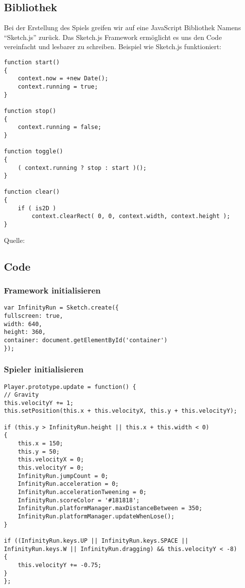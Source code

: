\subsection{Bibliothek}
Bei der Erstellung des Spiels greifen wir auf eine JavaScript Bibliothek Namens ``Sketch.js'' zurück.
Das Sketch.js Framework ermöglicht es uns den Code vereinfacht und lesbarer zu schreiben. 
Beispiel wie Sketch.js funktioniert:

\lstset{language=java}
\begin{lstlisting}[frame=single]
function start() 
{
	context.now = +new Date();
    context.running = true;
}
        
function stop() 
{
	context.running = false;
}
        
function toggle() 
{       
	( context.running ? stop : start )();
}
        
function clear() 
{        
	if ( is2D )
        context.clearRect( 0, 0, context.width, context.height );
}
\end{lstlisting}
Quelle: \cite{sketch}
\subsection{Code}
\subsubsection{Framework initialisieren}
\lstset{language=java}
\begin{lstlisting}[frame=single]
var InfinityRun = Sketch.create({
fullscreen: true,
width: 640,
height: 360,
container: document.getElementById('container')
});
\end{lstlisting}
\subsubsection{Spieler initialisieren}
\lstset{language=java}
\begin{lstlisting}[frame=single]
Player.prototype.update = function() {
// Gravity 
this.velocityY += 1;
this.setPosition(this.x + this.velocityX, this.y + this.velocityY);

if (this.y > InfinityRun.height || this.x + this.width < 0) 
{
	this.x = 150;
	this.y = 50;
	this.velocityX = 0;
	this.velocityY = 0;
	InfinityRun.jumpCount = 0;
	InfinityRun.acceleration = 0;
	InfinityRun.accelerationTweening = 0;
	InfinityRun.scoreColor = '#181818';
	InfinityRun.platformManager.maxDistanceBetween = 350;
	InfinityRun.platformManager.updateWhenLose();
}

if ((InfinityRun.keys.UP || InfinityRun.keys.SPACE || InfinityRun.keys.W || InfinityRun.dragging) && this.velocityY < -8) 
{
	this.velocityY += -0.75;
}
};
\end{lstlisting}
